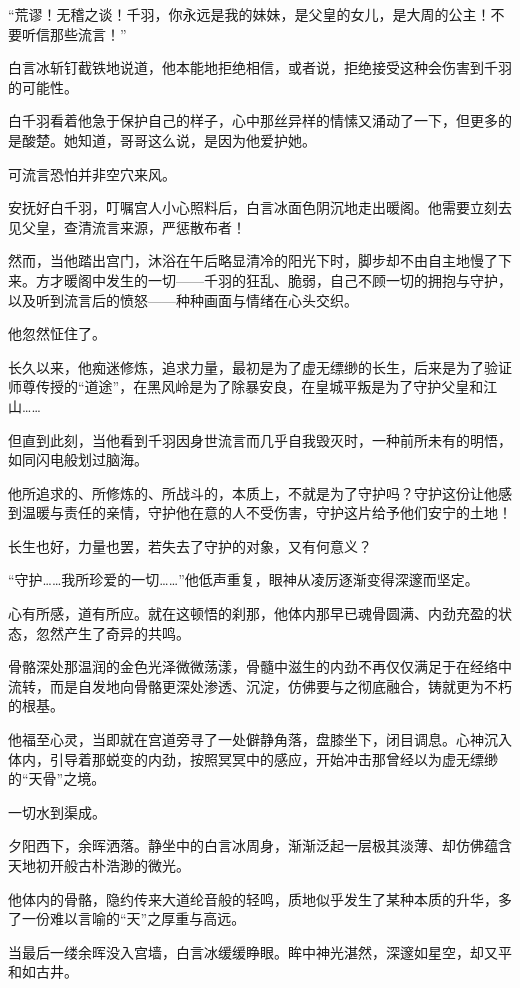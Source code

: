 “荒谬！无稽之谈！千羽，你永远是我的妹妹，是父皇的女儿，是大周的公主！不要听信那些流言！”

白言冰斩钉截铁地说道，他本能地拒绝相信，或者说，拒绝接受这种会伤害到千羽的可能性。

白千羽看着他急于保护自己的样子，心中那丝异样的情愫又涌动了一下，但更多的是酸楚。她知道，哥哥这么说，是因为他爱护她。

可流言恐怕并非空穴来风。

安抚好白千羽，叮嘱宫人小心照料后，白言冰面色阴沉地走出暖阁。他需要立刻去见父皇，查清流言来源，严惩散布者！

然而，当他踏出宫门，沐浴在午后略显清冷的阳光下时，脚步却不由自主地慢了下来。方才暖阁中发生的一切——千羽的狂乱、脆弱，自己不顾一切的拥抱与守护，以及听到流言后的愤怒——种种画面与情绪在心头交织。

他忽然怔住了。

长久以来，他痴迷修炼，追求力量，最初是为了虚无缥缈的长生，后来是为了验证师尊传授的“道途”，在黑风岭是为了除暴安良，在皇城平叛是为了守护父皇和江山……

但直到此刻，当他看到千羽因身世流言而几乎自我毁灭时，一种前所未有的明悟，如同闪电般划过脑海。

他所追求的、所修炼的、所战斗的，本质上，不就是为了守护吗？守护这份让他感到温暖与责任的亲情，守护他在意的人不受伤害，守护这片给予他们安宁的土地！

长生也好，力量也罢，若失去了守护的对象，又有何意义？

“守护……我所珍爱的一切……”他低声重复，眼神从凌厉逐渐变得深邃而坚定。

心有所感，道有所应。就在这顿悟的刹那，他体内那早已魂骨圆满、内劲充盈的状态，忽然产生了奇异的共鸣。

骨骼深处那温润的金色光泽微微荡漾，骨髓中滋生的内劲不再仅仅满足于在经络中流转，而是自发地向骨骼更深处渗透、沉淀，仿佛要与之彻底融合，铸就更为不朽的根基。

他福至心灵，当即就在宫道旁寻了一处僻静角落，盘膝坐下，闭目调息。心神沉入体内，引导着那蜕变的内劲，按照冥冥中的感应，开始冲击那曾经以为虚无缥缈的“天骨”之境。

一切水到渠成。

夕阳西下，余晖洒落。静坐中的白言冰周身，渐渐泛起一层极其淡薄、却仿佛蕴含天地初开般古朴浩渺的微光。

他体内的骨骼，隐约传来大道纶音般的轻鸣，质地似乎发生了某种本质的升华，多了一份难以言喻的“天”之厚重与高远。

当最后一缕余晖没入宫墙，白言冰缓缓睁眼。眸中神光湛然，深邃如星空，却又平和如古井。

